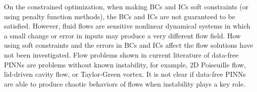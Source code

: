 On the constrained optimization, when making BCs and ICs soft constraints (or using penalty function methods), the BCs and ICs are not guaranteed to be satisfied.
However, fluid flows are sensitive nonlinear dynamical systems in which a small change or error in inputs may produce a very different flow field.
How using soft constraints and the errors in BCs and ICs affect the flow solutions have not been investigated.
Flow problems shown in current literature of data-free PINNs are problems without known instability, for example, 2D Poiseuille flow, lid-driven cavity flow, or Taylor-Green vortex.
It is not clear if data-free PINNs are able to produce chaotic behaviors of flows when instability plays a key role.

